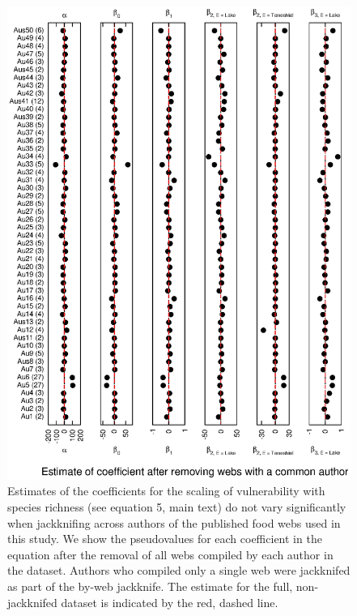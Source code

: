 \documentclass[12pt]{article}
\begin{document}
    \begin{figure}[!h]
    \centerline{\includegraphics*[height=.75\textheight]{Figures/Jackknife/Vul_author.eps}}
    \caption{Estimates of the coefficients for the scaling of vulnerability with species richness
    (see equation 5, main text) do not vary significantly
    when jackknifing across authors of the published food webs used in this study. 
    We show the pseudovalues for each coefficient
    in the equation after the removal of all webs compiled by each author in the dataset. Authors
    who compiled only a single web were jackknifed as part of the by-web jackknife.
    The estimate for the full, non-jackknifed dataset is indicated by the red, dashed line.}
    \label{Vul_web}
    \end{figure}


\end{document}
